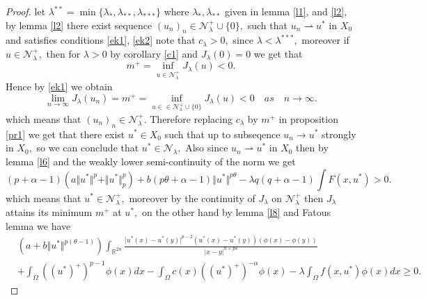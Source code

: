 \documentclass[10pt,twoside,reqno,centertags,draft]{amsart}
\begin{document}
\begin{proof}
let $ \lambda^{**} =\min\{ \lambda_{*}, \lambda_{**}, \lambda_{***}\}$ where $ \lambda_{*}, \lambda_{**}$ given in lemma \ref{l1}, and \ref{l2},
by lemma \ref{l2} there exist sequence $ (u_n)_n \in \mathcal{N}_{\lambda}^{+}\cup\{ 0\},$ such that $ u_n \rightharpoonup u^*$ in $ X_0$ and satisfies conditions \ref{ek1}, \ref{ek2} note that $ c_{\lambda} >0,$ since $ \lambda <\lambda^{***},$ moreover if  $ u \in  \mathcal{N}_{\lambda}^{+},$ then for $ \lambda >0$ by corollary \ref{c1} and  $ J_{\lambda}(0) =0$ we get that
\begin{equation*}
m^{+} =\inf_{u \in \mathcal{N}_{\lambda}^{+}}J_{\lambda}(u) <0.
\end{equation*}
Hence by \ref{ek1} we obtain
\begin{equation*}
\lim_{n \to \infty}J_{\lambda}(u_n) =m^+  =\inf_{u \in \in \mathcal{N}_{\lambda}^{+}\cup\{ 0\}} J_{\lambda}(u) <0 \quad \textit{as} \quad n \to \infty.
\end{equation*}
which means that $ (u_n)_n \in \mathcal{N}_{\lambda}^{+}.$ Therefore replacing $ c_{\lambda}$ by $ m^+$ in proposition \ref{pr1} we get that there exist $ u^* \in X_0$ such that up to subseqence $ u_n \longrightarrow u^*$ strongly in $ X_0,$ so we can conclude that $ u^* \in \mathcal{N}_{\lambda},$
Also since $ u_n \rightharpoonup u^*$ in $ X_0$ then by lemma \ref{l6} and the weakly lower semi-continuity of the norm we get 
\begin{equation*}
(p +\alpha -1) \left(a\Vert u^* \Vert^p + \Vert u^* \Vert_{p}^{p}\right) + b(p \theta +\alpha -1)\Vert u^* \Vert^{p \theta} 
- \lambda q (q +\alpha -1) \int F(x,u^*) >0.
\end{equation*}
which means that $ u^* \in \mathcal{N}_{\lambda}^{+},$ moreover by the continuity of $ J_{\lambda}$ on $ \mathcal{N}_{\lambda}^{+}$ then $ J_{\lambda}$ attains its minimum $ m^+$ at $ u^*,$ on the other hand by lemma \ref{l8} and Fatous lemma we have 
\begin{equation}\label{eee60}
\begin{aligned}
& \left(a +b\Vert u^* \Vert^{p(\theta -1)}\right) \int_{\mathbb{R}^{2n}} \frac{\vert u^*(x) - u^*(y) \vert^{p-2}(u^*(x) - u^*(y))(\phi(x) - \phi(y))}{\vert x-y \vert^{n + ps}}\\
& + \int_{\Omega}((u^*)^+)^{p -1} \phi(x) dx  - \int_{\Omega} c(x) ((u^*)^+)^{-\alpha} \phi(x) - 
\lambda \int_{\Omega} f(x,u^*) \phi(x)dx \geq 0.
\end{aligned}
\end{equation}

\end{proof}
\end{document}
